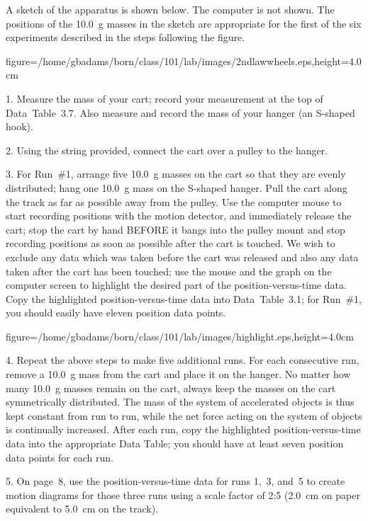 A sketch of the apparatus is shown below.  The computer is
not shown.  The positions of the 10.0~g masses in the sketch are
appropriate for the first of the six experiments described in the
steps following the figure.
\smallskip
\smallskip
\centerline{\psfig
{figure=/home/gbadams/born/class/101/lab/images/2ndlawwheels.eps,height=4.0cm}}
\smallskip
\item{1.} Measure the mass of your cart; record your measurement
at the top of Data~Table~3.7.  Also measure and record the mass of
your hanger (an S-shaped hook).

\item{2.} Using the string provided, connect the cart 
over a pulley to the hanger.  

\item{3.} For Run~\#1, arrange five 10.0~g masses on the cart so that
they are evenly distributed; hang one 10.0~g mass on the S-shaped hanger.
Pull the cart along the track as far as possible away from the pulley.
Use the computer mouse to start recording positions with the motion
detector, and immediately release the cart; stop the cart by hand BEFORE
it bangs into the pulley mount and stop recording positions as soon as
possible after the cart is touched.  We wish to exclude any data which
was taken before the cart was released and also any data taken after
the cart has been touched; use the mouse and the graph on the
computer screen to highlight the desired part of the position-versus-time
data.  Copy the highlighted position-versus-time data into Data~Table~3.1;
for Run~\#1, you should easily have eleven position data points. 
\smallskip
\smallskip
\centerline{\psfig
{figure=/home/gbadams/born/class/101/lab/images/highlight.eps,height=4.0cm}}
\smallskip
\item{4.} Repeat the above steps to make five additional runs.  For each
consecutive run, remove a 10.0~g mass from the cart and place it on the
hanger.  No matter how many 10.0~g masses remain on the cart, always keep
the masses on the cart symmetrically distributed.  The mass of the system
of accelerated objects is thus kept constant from run to run, while the
net force acting on the system of objects is continually increased.  After
each run, copy the highlighted position-versus-time data into the
appropriate Data Table; you should have at least seven position data
points for each run.

\item{5.} On page~8, use the position-versus-time data for runs 1,~3,
and~5 to create motion diagrams for those three runs using a scale
factor of 2:5 (2.0~cm on paper equivalent to 5.0~cm on the track).

